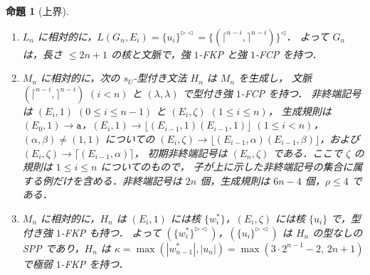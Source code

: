 \documentclass[11pt,a4paper]{ltjsarticle}
\numberwithin{equation}{section}
\theoremstyle{plain}
\newtheorem{proposition}[theorem]{命題}
\theoremstyle{definition}
\theoremstyle{remark}
\theoremstyle{plain}
\newcommand{\eps}{\lambda}
\newcommand{\Lc}{^{\lhd}}
\newcommand{\RL}{^{\rhd\lhd}}
\newcommand{\Lfl}{\lfloor}
\newcommand{\Rfl}{\rfloor}
\newcommand{\Lce}{\lceil}
\newcommand{\Rce}{\rceil}
\newcommand{\ta}{\mathtt a}
\begin{document}
\begin{proposition}[上界]\label{prop:deletion-upper}
\begin{enumerate}[label=\textup{(\alph*)},nosep]
\item $L_n$ に相対的に，$L(G_n,E_i)=\{u_i\}\RL=\{(\Lce^{n-i},\Rce^{n-i})\}\Lc$．
よって $G_n$ は，長さ $\le2n+1$ の核と文脈で，強 $1$-FKP と強 $1$-FCP を持つ．
\item $M_n$ に相対的に，次の $s_U$-型付き文法 $H_n$ は $M_n$ を生成し，
文脈 $(\Lce^{n-i},\Rce^{n-i})$ $(i<n)$ と $(\eps,\eps)$ で型付き強 $1$-FCP を持つ．
非終端記号は $(E_i,1)$ $(0\le i\le n-1)$ と $(E_i,\zeta)$ $(1\le i\le n)$，
生成規則は $(E_0,1)\to\ta$，$(E_i,1)\to\Lfl(E_{i-1},1)(E_{i-1},1)\Rfl$ $(1\le i<n)$，
$(\alpha,\beta)\ne(1,1)$ についての $(E_i,\zeta)\to\Lfl(E_{i-1},\alpha)(E_{i-1},\beta)\Rfl$，および $(E_i,\zeta)\to\Lce(E_{i-1},\alpha)\Rce$，
初期非終端記号は $(E_n,\zeta)$ である．ここで $\zeta$ の規則は $1\le i\le n$ についてのもので，
子が上に示した非終端記号の集合に属する例だけを含める．非終端記号は $2n$ 個，生成規則は $6n-4$ 個，$\rho\le4$ である．
\item $M_n$ に相対的に，$H_n$ は $(E_i,1)$ には核 $\{w^*_i\}$，$(E_i,\zeta)$ には核 $\{u_i\}$ で，型付き強 $1$-FKP も持つ．
よって $(\{w^*_i\}\RL)$，$(\{u_i\}\RL)$ は $H_n$ の型なしの SPP であり，$H_n$ は
$\kappa=\max(|w^*_{n-1}|,|u_n|)=\max(3\cdot2^{n-1}-2,\,2n+1)$ で極弱 $1$-FKP を持つ．
\end{enumerate}
\end{proposition}
\end{document}
